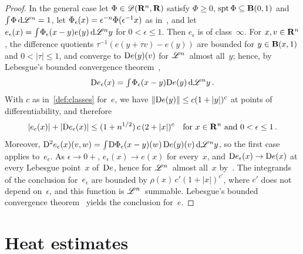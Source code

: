 \documentclass[a4paper,twoside,leqno]{article}
\begin{document}
\begin{proof}
    In the general case let $\Phi \in \mathscr{D}(\mathbf{R}^{n},\mathbf{R})$ satisfy $\Phi \ge 0$, $\operatorname{spt} \Phi
    \subseteq \mathbf{B}(0,1)$ and ${\textstyle\int_{}^{}} \Phi \,\mathrm{d} \mathscr{L}^{n} = 1$, let $\Phi_\epsilon(x) =
    \epsilon^{-n} \Phi(\epsilon^{-1} x)$ as in~\cite[4.1.2]{Federer1969}, and let
    $e_\epsilon(x) = {\textstyle\int_{}^{}} \Phi_\epsilon(x-y) e(y) \,\mathrm{d} \mathscr{L}^{n} y$ for $0 < \epsilon \le
    1$. Then $e_\epsilon$ is of class~$\infty$. For $x, v \in \mathbf{R}^{n}$, the difference
    quotients $\tau^{-1}(e(y + \tau v) - e(y))$ are bounded for $y \in \mathbf{B}(x,1)$ and $0 <
    |\tau| \le 1$, and converge to $\mathrm{D} e(y)(v)$ for $\mathscr{L}^{n}$~almost all~$y$; hence, by
    Lebesgue's bounded convergence theorem~\cite[2.4.9]{Federer1969},
    \begin{displaymath}
        \mathrm{D} e_\epsilon(x) = {\textstyle\int_{}^{}} \Phi_\epsilon(x-y) \mathrm{D} e(y) \,\mathrm{d} \mathscr{L}^{n} y \,.
    \end{displaymath}
    With $c$ as in~\ref{def:classes} for~$e$, we have $\|\mathrm{D} e(y)\| \le c(1 + |y|)^c$ at points of
    differentiability, and therefore
    \begin{displaymath}
        |e_\epsilon(x)| + |\mathrm{D} e_\epsilon(x)| \le (1 + n^{1/2}) \, c \, (2 + |x|)^c
        \quad \text{for $x \in \mathbf{R}^{n}$ and $0 < \epsilon \le 1$} \,.
    \end{displaymath}
    Moreover, $\mathrm{D}^2 e_\epsilon(x)(v,w) = {\textstyle\int_{}^{}} \mathrm{D} \Phi_\epsilon(x-y)(w) \, \mathrm{D} e(y)(v) \,\mathrm{d}
    \mathscr{L}^{n} y$, so the first case applies to~$e_\epsilon$. As $\epsilon \to 0+$,
    $e_\epsilon(x) \to e(x)$ for every~$x$, and $\mathrm{D} e_\epsilon(x) \to \mathrm{D} e(x)$ at every Lebesgue
    point~$x$ of~$\mathrm{D} e$, hence for $\mathscr{L}^{n}$~almost all~$x$ by~\cite[2.9.9]{Federer1969}. The
    integrands of the conclusion for~$e_\epsilon$ are bounded by $\rho(x) \, c' (1 + |x|)^{c'}$,
    where $c'$ does not depend on~$\epsilon$, and this function is $\mathscr{L}^{n}$~summable.
    Lebesgue's bounded convergence theorem~\cite[2.4.9]{Federer1969} yields the conclusion
    for~$e$.
\end{proof}

\section{Heat estimates}
\label{sec:estimates}
\end{document}
